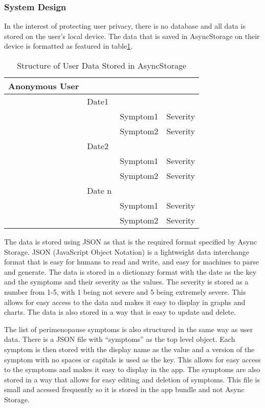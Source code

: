 \subsubsection{System Design}
In the interest of protecting user privacy, there is no database and all data is stored on the user's local device. The data that is saved in AsyncStorage on their device is formatted as featured in table\ref{table:user-data}. 
\begin{table}[h!!]
    \caption{Structure of User Data Stored in AsyncStorage}
    \label{table:user-data}
    \begin{tabular}{llll}
    \hline
    Anonymous User &        &          &          \\ \hline
                  & Date1  &          &          \\
                  &        & Symptom1 & Severity \\
                  &        & Symptom2 & Severity \\
                  & Date2  &          &          \\
                  &        & Symptom1 & Severity \\
                  &        & Symptom2 & Severity \\
                  & Date n &          &          \\
                  &        & Symptom1 & Severity \\
                  &        & Symptom2 & Severity \\ \hline
  \end{tabular}
\end{table}

The data is stored using JSON as that is the required format specified by Async Storage. JSON (JavaScript Object Notation) is a lightweight data interchange format that is easy for humans to read and write, and easy for machines to parse and generate\cite{JSON2025}. The data is stored in a dictionary format with the date as the key and the symptoms and their severity as the values. The severity is stored as a number from 1-5, with 1 being not severe and 5 being extremely severe. This allows for easy access to the data and makes it easy to display in graphs and charts. The data is also stored in a way that is easy to update and delete.

The list of perimenopause symptoms is also structured in the same way as user data. There is a JSON file with ``symptoms'' as the top level object. Each symptom is then stored with the display name as the value and a version of the symptom with no spaces or capitals is used as the key. This allows for easy access to the symptoms and makes it easy to display in the app. The symptoms are also stored in a way that allows for easy editing and deletion of symptoms. This file is small and acessed frequently so it is stored in the app bundle and not Async Storage.
